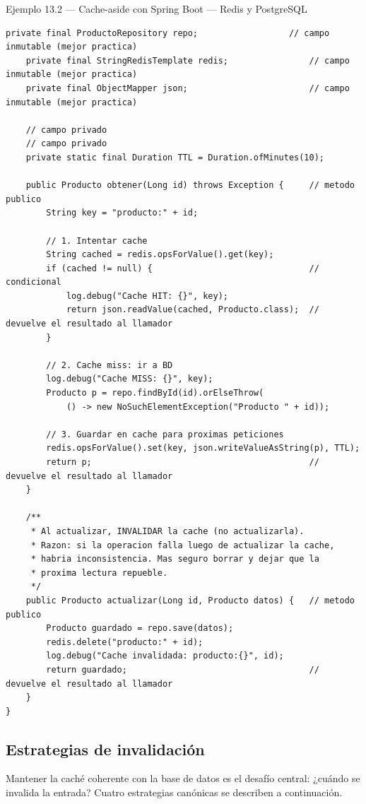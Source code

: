 \documentclass[11pt,a4paper,openany]{book}
\begin{document}
\begin{cajaejemplo}{Ejemplo 13.2 --- Cache-aside con Spring Boot --- Redis y PostgreSQL}
\begin{lstlisting}[style=java,caption={ProductoService.java},label=lst:13.3]
    private final ProductoRepository repo;                  // campo inmutable (mejor practica)
    private final StringRedisTemplate redis;                // campo inmutable (mejor practica)
    private final ObjectMapper json;                        // campo inmutable (mejor practica)

    // campo privado
    // campo privado
    private static final Duration TTL = Duration.ofMinutes(10);

    public Producto obtener(Long id) throws Exception {     // metodo publico
        String key = "producto:" + id;

        // 1. Intentar cache
        String cached = redis.opsForValue().get(key);
        if (cached != null) {                               // condicional
            log.debug("Cache HIT: {}", key);
            return json.readValue(cached, Producto.class);  // devuelve el resultado al llamador
        }

        // 2. Cache miss: ir a BD
        log.debug("Cache MISS: {}", key);
        Producto p = repo.findById(id).orElseThrow(
            () -> new NoSuchElementException("Producto " + id));

        // 3. Guardar en cache para proximas peticiones
        redis.opsForValue().set(key, json.writeValueAsString(p), TTL);
        return p;                                           // devuelve el resultado al llamador
    }

    /**
     * Al actualizar, INVALIDAR la cache (no actualizarla).
     * Razon: si la operacion falla luego de actualizar la cache,
     * habria inconsistencia. Mas seguro borrar y dejar que la
     * proxima lectura repueble.
     */
    public Producto actualizar(Long id, Producto datos) {   // metodo publico
        Producto guardado = repo.save(datos);
        redis.delete("producto:" + id);
        log.debug("Cache invalidada: producto:{}", id);
        return guardado;                                    // devuelve el resultado al llamador
    }
}
\end{lstlisting}
\end{cajaejemplo}

\subsection{Estrategias de invalidación}

Mantener la caché coherente con la base de datos es el
desafío central: ¿cuándo se invalida la entrada? Cuatro estrategias
canónicas se describen a continuación.
\end{document}
